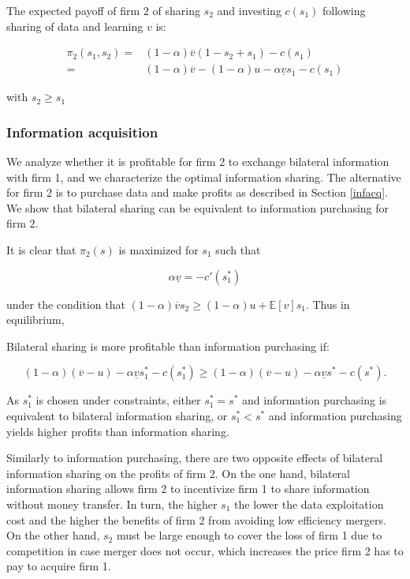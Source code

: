 \documentclass[a4paper,leqno]{article}%
\newcommand{\E}{\mathbb E}
\renewcommand{\a}{\alpha}
\newcommand{\uv}{\underline{v}}
\newcommand{\ov}{\overline{v}}
\begin{document}
The expected payoff of firm $2$ of sharing $s_2$ and investing $c(s_1)$ following sharing of data and learning $v$ is:

\begin{equation}
    \begin{aligned}
    \pi_2(s_1,s_2)=&(1-\a)\ov(1-s_2+s_1)-c(s_1)\\
                =&(1-\a)\ov-(1-\a)u-\a \uv s_1-c(s_1)
    \end{aligned}
\end{equation}


with $s_2\geq s_1$

\medskip

\subsubsection{Information acquisition}

We analyze whether it is profitable for firm 2 to exchange bilateral information with firm 1, and we characterize the optimal information sharing. The alternative for firm 2 is to purchase data and make profits as described in Section \ref{infacq}. We show that bilateral sharing can be equivalent to information purchasing for firm $2$. 

\medskip

It is clear that $\pi_2(s)$ is maximized for $s_1$ such that 

$$\a \uv =-c'(s_1^*)$$

under the condition that $(1-\a)\ov s_2 \geq (1-\a)u+\E[v]s_1$. Thus in equilibrium, 

\medskip

Bilateral sharing is more profitable than information purchasing if:

$$(1-\a)(\ov-u)-\a\uv s_1^* -c(s_1^*)\geq(1-\a)(\ov -u)-\a \uv s^*-c(s^*).$$

\medskip

As $s_1^*$ is chosen under constraints, either $s_1^*=s^*$ and information purchasing is equivalent to bilateral information sharing, or $s_1^*< s^*$ and information purchasing yields higher profits than information sharing. 

\medskip
%
Similarly to information purchasing, there are two opposite effects of bilateral information sharing on the profits of firm 2. On the one hand, bilateral information sharing allows firm 2 to incentivize firm 1 to share information without money transfer. In turn, the higher $s_1$ the lower the data exploitation cost and the higher the benefits of firm 2 from avoiding low efficiency mergers. On the other hand, $s_2$ must be large enough to cover the loss of firm 1 due to competition in case merger does not occur, which increases the price firm 2 has to pay to acquire firm 1. 
\end{document}
